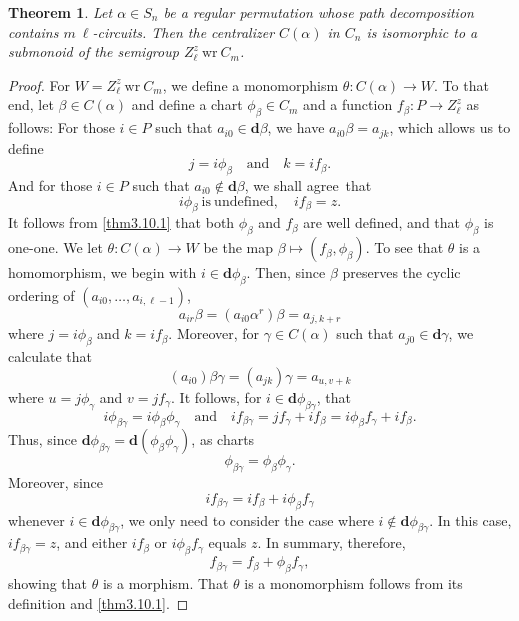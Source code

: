 \documentclass{surv-l}
\numberwithin{equation}{section}
\numberwithin{table}{section}
\numberwithin{figure}{section}
\theoremstyle{plain}
\newtheorem{theorem}[equation]{Theorem}
\theoremstyle{definition}
\begin{document}
\begin{theorem}\label{thm4.14.1}
Let $\alpha\in S_{n}$ be a regular permutation whose path
decomposition contains $m\ \ell$-circuits. Then the centralizer
$C(\alpha)$ in $C_{n}$ is isomorphic to a submonoid of the
semigroup $Z_{\ell}^{z}\ \mathrm{wr}\ C_{m}$.
\end{theorem}

\begin{proof} For $W=Z_{\ell}^{z}\  \mathrm{wr} \ C_{m}$, we define a monomorphism
$\theta : C(\alpha)\rightarrow W$. To that end, let $\beta\in
C(\alpha)$ and define a chart $\phi_{\beta}\in C_{m}$ and a
function $f_{\beta} : P\rightarrow Z_{\ell}^{z}$ as follows: For
those $i\in P$ such that $ a_{i0}\in \mathbf{d}\beta$, we have
$a_{i0}\beta=a_{jk}$, which allows us to define
\[
j=i\phi_{\beta}\quad \mathrm{and}\quad k=if_{\beta}.
\]
And for those $i\in P$ such that $a_{i0}\not\in \mathbf{d}\beta$,
we shall agree~that
\[
i\phi_{\beta}\ \mathrm{is\ undefined,}\quad if_{\beta}=z.
\]
It follows from \ref{thm3.10.1} that both $\phi_{\beta}$ and
$f_{\beta}$ are well defined, and that $\phi_{\beta}$ is one-one.
We let $\theta : C(\alpha)\rightarrow W$ be the map
$\beta\mapsto(f_{\beta},\phi_{\beta})$. To see that $\theta$ is
a homomorphism, we begin with $i\in \mathbf{d}\phi_{\beta}$. Then,
since $\beta$ preserves the cyclic ordering of $(a_{i0},\ldots,
a_{i,\ell-1})$,
\[
a_{ir}\beta=(a_{i0}\alpha^{r})\beta=a_{j,k+r}
\]
where $j=i\phi_{\beta}$ and $k=if_{\beta}$. Moreover, for
$\gamma\in C(\alpha)$ such that $a_{j0}\in \mathbf{d}\gamma$, we
calculate that
\[
(a_{i0})\beta\gamma=(a_{jk})\gamma=a_{u,v+k}
\]
where $u=j\phi_{\gamma}$ and $v=jf_{\gamma}$. It follows, for
$i\in \mathbf{d}\phi_{\beta\gamma}$, that
\[
i\phi_{\beta\gamma}=i\phi_{\beta}\phi_{\gamma}\quad \mathrm{and}\quad
if_{\beta\gamma}=jf_{\gamma}+if_{\beta}=i\phi_{\beta}f_{\gamma}+if_{\beta}.
\]
Thus, since
$\mathbf{d}\phi_{\beta\gamma}=\mathbf{d}(\phi_{\beta}\phi_{\gamma})$,
as charts
\[
\phi_{\beta\gamma}=\phi_{\beta}\phi_{\gamma}.
\]
Moreover, since
\[
if_{\beta\gamma}=if_{\beta}+i\phi_{\beta}f_{\gamma}
\]
whenever $i\in \mathbf{d}\phi_{\beta\gamma}$, we only need to
consider the case where $i\not\in \mathbf{d}\phi_{\beta\gamma}$.
In this case, $if_{\beta\gamma}=z$, and either $if_{\beta}$ or
$i\phi_{\beta}f_{\gamma}$ equals $z$. In summary, therefore,
\[
f_{\beta\gamma}=f_{\beta}+\phi_{\beta}f_{\gamma},
\]
showing that $\theta$ is a morphism. That $\theta$ is a
monomorphism follows from its definition and \ref{thm3.10.1}.
\end{proof}
\end{document}
